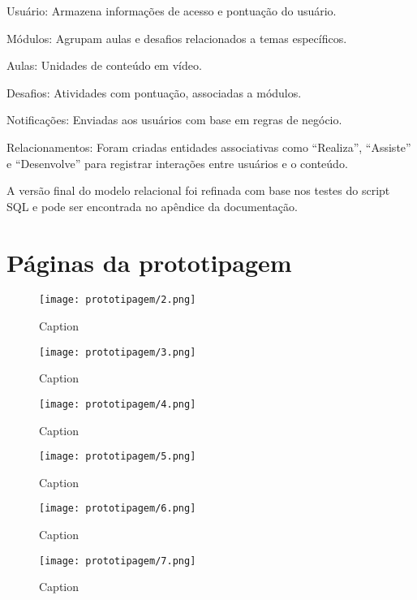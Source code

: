 \documentclass[
	article,			%
	12pt,				%
	oneside,			%
	a4paper,			%
	english,			%
	brazil,				%
	sumario=tradicional
	]{abntex2}
\begin{document}
\begin{apendicesenv}
Usuário: Armazena informações de acesso e pontuação do usuário.

Módulos: Agrupam aulas e desafios relacionados a temas específicos.

Aulas: Unidades de conteúdo em vídeo.

Desafios: Atividades com pontuação, associadas a módulos.

Notificações: Enviadas aos usuários com base em regras de negócio.

Relacionamentos: Foram criadas entidades associativas como “Realiza”, “Assiste” e “Desenvolve” para registrar interações entre usuários e o conteúdo.

A versão final do modelo relacional foi refinada com base nos testes do script SQL e pode ser encontrada no apêndice da documentação.
\newpage
\chapter{Páginas da prototipagem}

\begin{figure}[!htbp]
    \centering
    \texttt{[image: prototipagem/2.png]}
    \caption{Caption}
    \label{fig:enter-label}
\end{figure}

\begin{figure}
    \centering
    \texttt{[image: prototipagem/3.png]}
    \caption{Caption}
    \label{fig:enter-label}
\end{figure}

\begin{figure}
    \centering
    \texttt{[image: prototipagem/4.png]}
    \caption{Caption}
    \label{fig:enter-label}
\end{figure}

\begin{figure}
    \centering
    \texttt{[image: prototipagem/5.png]}
    \caption{Caption}
    \label{fig:enter-label}
\end{figure}

\begin{figure}
    \centering
    \texttt{[image: prototipagem/6.png]}
    \caption{Caption}
    \label{fig:enter-label}
\end{figure}

\begin{figure}
    \centering
    \texttt{[image: prototipagem/7.png]}
    \caption{Caption}
    \label{fig:enter-label}
\end{figure}


\end{apendicesenv}
\end{document}
